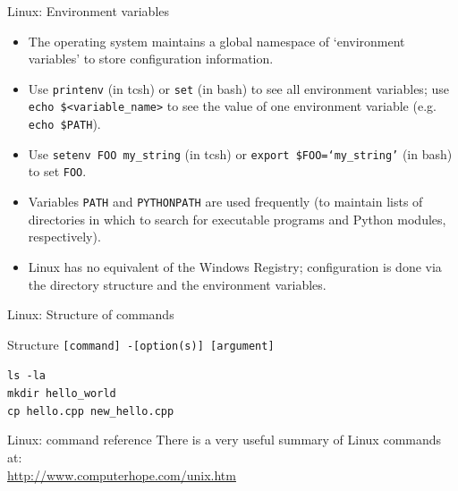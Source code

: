 \documentclass{beamer}
\begin{document}
\begin{frame}{Linux: Environment variables}
  \begin{itemize}
    \item The operating system maintains a global namespace of `environment variables' to store configuration information.
    \item Use \alert{\texttt{printenv}} (in tcsh) or \alert{\texttt{set}} (in bash) to see all environment variables; use \alert{\texttt{echo \$<variable\_name>}} to see the value of one environment variable (e.g. \alert{\texttt{echo \$PATH}}).
    \item Use \alert{\texttt{setenv FOO my\_string}} (in tcsh) or \alert{\texttt{export \$FOO=`my\_string'}} (in bash) to set \texttt{FOO}.
    \item Variables \texttt{PATH} and \texttt{PYTHONPATH} are used frequently (to maintain lists of directories in which to search for executable programs and Python modules, respectively).
    \item Linux has no equivalent of the Windows Registry; configuration is done via the directory structure and the environment variables.
  \end{itemize}
\end{frame}



\begin{frame}{Linux: Structure of commands}
  \begin{block}{Structure}
    \texttt{[command] -[option(s)] [argument]}
  \end{block}
  \begin{Examples}
     \texttt{ls -la \\
     mkdir hello\_world \\
     cp hello.cpp new\_hello.cpp} \\
  \end{Examples}
\end{frame}

\begin{frame}{Linux: command reference}
There is a very useful summary of Linux commands at: \\
\url{http://www.computerhope.com/unix.htm}
\end{frame}
\end{document}
